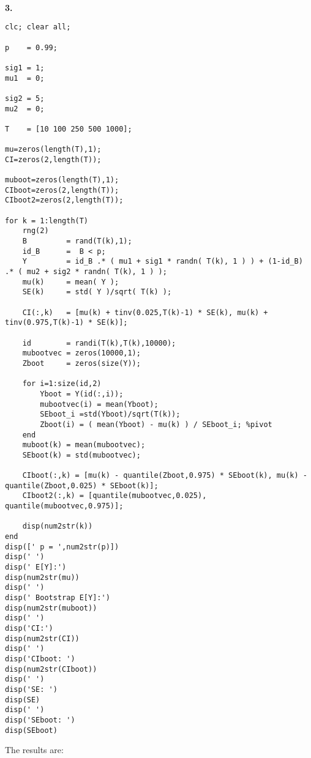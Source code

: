\documentclass[letterpaper,11pt]{article}
\begin{document}
\begin{lstlisting}
	
\end{lstlisting}




\begin{addmargin}[-2em]{0em} \large{\textbf{3. }}\end{addmargin}


\begin{lstlisting}
clc; clear all;

p    = 0.99;

sig1 = 1; 
mu1  = 0;

sig2 = 5;
mu2  = 0;

T    = [10 100 250 500 1000];

mu=zeros(length(T),1);
CI=zeros(2,length(T));

muboot=zeros(length(T),1);
CIboot=zeros(2,length(T));
CIboot2=zeros(2,length(T));

for k = 1:length(T)
    rng(2)
    B         = rand(T(k),1);
    id_B      =  B < p;
    Y         = id_B .* ( mu1 + sig1 * randn( T(k), 1 ) ) + (1-id_B) .* ( mu2 + sig2 * randn( T(k), 1 ) );
    mu(k)     = mean( Y );
    SE(k)     = std( Y )/sqrt( T(k) );
    
    CI(:,k)   = [mu(k) + tinv(0.025,T(k)-1) * SE(k), mu(k) + tinv(0.975,T(k)-1) * SE(k)];
    
    id        = randi(T(k),T(k),10000);
    mubootvec = zeros(10000,1);
    Zboot     = zeros(size(Y));
    
    for i=1:size(id,2)
        Yboot = Y(id(:,i));
        mubootvec(i) = mean(Yboot);
        SEboot_i =std(Yboot)/sqrt(T(k));
        Zboot(i) = ( mean(Yboot) - mu(k) ) / SEboot_i; %pivot
    end
    muboot(k) = mean(mubootvec);
    SEboot(k) = std(mubootvec);
   
    CIboot(:,k) = [mu(k) - quantile(Zboot,0.975) * SEboot(k), mu(k) - quantile(Zboot,0.025) * SEboot(k)];
    CIboot2(:,k) = [quantile(mubootvec,0.025), quantile(mubootvec,0.975)];
    
    disp(num2str(k))
end
disp([' p = ',num2str(p)])
disp(' ')
disp(' E[Y]:')
disp(num2str(mu))
disp(' ')
disp(' Bootstrap E[Y]:')
disp(num2str(muboot))
disp(' ')
disp('CI:')
disp(num2str(CI))
disp(' ')
disp('CIboot: ')
disp(num2str(CIboot))
disp(' ')
disp('SE: ')
disp(SE)
disp(' ')
disp('SEboot: ')
disp(SEboot)
\end{lstlisting}

The results are:
\end{document}
